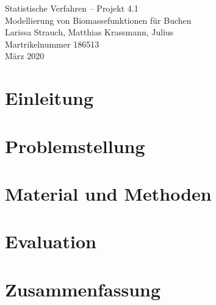 \documentclass[11pt,titlepage,oneside,openany]{book}
\begin{document}
\begin{titlepage}
	\vspace*{2cm}
  \begin{center}
   {\Large Statistische Verfahren -- Projekt 4.1\\}
   {
   	\Large Modellierung von Biomassefunktionen für Buchen \\
	}
   \vspace{2cm} 
   {
    Larissa Strauch, Matthias Krassmann, Julius  \\
    Martrikelnummer 186513\\
   }
   \vspace{2cm} 
   {März 2020}
  \end{center}
\end{titlepage} 

\tableofcontents
\newpage



\newpage



\chapter{Einleitung}

\chapter{Problemstellung}

\chapter{Material und Methoden}

\chapter{Evaluation}

\chapter{Zusammenfassung}

{}


\pagestyle{empty}
\end{document}
